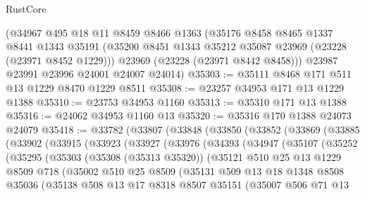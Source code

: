 \begin{lexlean}{RustCore}
\begin{coremodule}
    (@34967
      @495
      @18
      @11
      @8459
      @8466
      @1363
      (@35176
        @8458
        @8465
        @1337
        @8441
        @1343
        @35191
        (@35200 @8451 @1343 @35212 @35087 @23969 (@23228 (@23971 @8452 @1229)))
        @23969
        (@23228 (@23971 @8442 @8458)))
      @23987
      @23991
      @23996
      @24001
      @24007
      @24014)
@35303 := @35111 @8468 @171 @511 @13 @1229 @8470 @1229 @8511
@35308 := @23257 @34953 @171 @13 @1229 @1388
@35310 := @23753 @34953 @1160
@35313 := @35310 @171 @13 @1388
@35316 := @24062 @34953 @1160 @13
@35320 := @35316 @170 @1388 @24073 @24079
@35418 := @33782
    (@33807
      (@33848
        (@33850
          (@33852
            (@33869
              (@33885
                (@33902
                  (@33915
                    (@33923
                      (@33927
                        (@33976
                          (@34393
                            (@34947
                              (@35107
                                (@35252
                                  (@35295
                                    (@35303
                                      (@35308 (@35313 @35320))
                                      (@35121
                                        @510
                                        @25
                                        @13
                                        @1229
                                        @8509
                                        @718
                                        (@35002
                                          @510
                                          @25
                                          @8509
                                          (@35131
                                            @509
                                            @13
                                            @18
                                            @1348
                                            @8508
                                            @35036
                                            (@35138
                                              @508
                                              @13
                                              @17
                                              @8318
                                              @8507
                                              @35151
                                              (@35007
                                                @506
                                                @71
                                                @13

\end{coremodule}
\end{lexlean}
